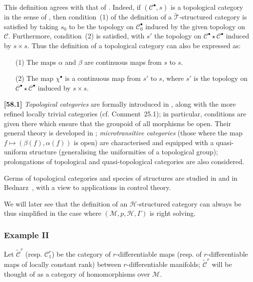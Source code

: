 \documentclass[a4paper,fleqn]{article}
\theoremstyle{plain}
\theoremstyle{definition}
\newenvironment{longcomm}[1]
  {\noindent\textbf{[#1]}\rmfamily}
  {}
\newcommand{\CC}{\mathcal{C}}
\newcommand{\tCC}{\widetilde{\CC}}
\newcommand{\HH}{\mathcal{H}}
\newcommand{\MM}{\mathcal{M}}
\newcommand{\TT}{\mathcal{T}}
\newcommand{\tTT}{\widetilde{\TT}}
\newcommand{\smallbullet}{\bullet}
\begin{document}
This definition agrees with that of \cite{3b}.
Indeed, if $(\CC^\smallbullet,s)$ is a topological category in the sense of \cite{3b}, then condition~(1) of the definition of a $\tTT$-structured category is satisfied by taking $s_0$ to be the topology on $\CC_0^\smallbullet$ induced by the given topology on $\CC$.
Furthermore, condition~(2) is satisfied, with $s'$ the topology on $\CC^\smallbullet\star\CC^\smallbullet$ induced by $s\times s$.
Thus the definition of a topological category can also be expressed as:

\begin{enumerate}
  \item[\normalfont(1)]
    The maps $\alpha$ and $\beta$ are continuous maps from $s$ to $s$.
  \item[\normalfont(2)]
    The map $\chi^\smallbullet$ is a continuous map from $s'$ to $s$, where $s'$ is the topology on $\CC^\smallbullet\star\CC^\smallbullet$ induced by $s\times s$.
\end{enumerate}

\begin{longcomm}{58.1}
  \emph{Topological categories} are formally introduced in \cite{coll50}, along with the more refined locally trivial categories (cf. Comment~25.1);
  in particular, conditions are given there which ensure that the groupoid of all morphisms be open.
  Their general theory is developed in \cite{coll92};
  \emph{microtransitive categories} (those where the map $f\mapsto(\beta(f),\alpha(f))$ is open) are characterised and equipped with a quasi-uniform structure (generalising the uniformities of a topological group);
  prolongations of topological and quasi-topological categories are also considered.

  Germs of topological categories and species of structures are studied in \cite{comm29} and in Bednarz~\cite{comm3}, with a view to applications in control theory.
\end{longcomm}

We will later see that the definition of an $\HH$-structured category can always be thus simplified in the case where $(\MM,p,\HH,\Gamma)$ is right solving.


\subsubsection*{Example II}
\label{section:ii.3.ii}

Let $\tCC^r$ (resp. $\CC_1^r$) be the category of $r$-differentiable maps (resp. of $r$-differentiable maps of locally constant rank) between $r$-differentiable manifolds;
$\tCC^r$ will be thought of as a category of homomorphisms over $\MM$.
\end{document}
